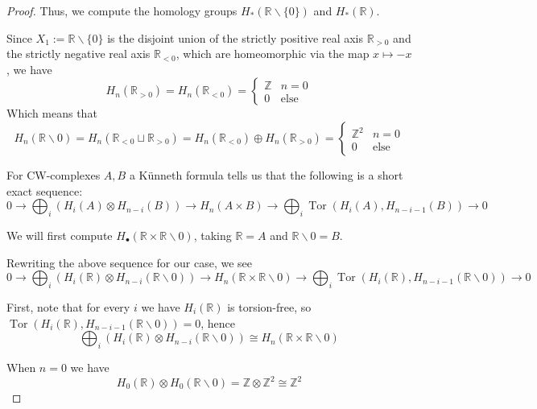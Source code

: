 \documentclass{article}
\DeclareMathOperator{\Tor}{Tor}
\begin{document}
\begin{enumerate}
\begin{proof}
		Thus, we compute the homology groups $H_*(\mathbb{R} \backslash \{0\})$ and $H_*(\mathbb{R})$.
		
		Since $X_1 := \mathbb{R} \backslash \{0\}$ is the disjoint union of the strictly positive real axis $\mathbb{R}_{> 0}$ and the strictly negative real axis $\mathbb{R}_{< 0}$, which are homeomorphic via the map $x \mapsto -x$,
		we have 
		\[H_n(\mathbb{R}_{> 0}) = H_n(\mathbb{R}_{< 0}) = \begin{cases} \mathbb{Z} &n=0 \\ 0 &\text{else}  \end{cases} \]
		Which means that
		\[H_n(\mathbb{R} \backslash 0) = H_n(\mathbb{R}_{< 0}\sqcup \mathbb{R}_{> 0} ) = H_n(\mathbb{R}_{< 0}) \oplus H_n(\mathbb{R}_{> 0} )  = \begin{cases} \mathbb{Z}^2 & n=0 \\ 0 & \text{else} \end{cases}\]
		
		
		For CW-complexes $A,B$ a K\"unneth formula tells us that the following is a short exact sequence:
		\begin{equation} 0 \rightarrow \bigoplus_i \left ( H_i(A) \otimes H_{n-i}(B) \right ) \rightarrow H_n(A\times B) \rightarrow
		\bigoplus_i \Tor \left ( H_i(A), H_{n-i-1}(B) \right ) \rightarrow 0 \label{seq:Kunneth}\end{equation}
		
		We will first compute $H_\bullet (\mathbb{R} \times \mathbb{R}\backslash 0)$, taking $\mathbb{R} = A$ and $\mathbb{R}\backslash 0 = B$.
		
		Rewriting the above sequence for our case, we see 
		\[ 0 \rightarrow \bigoplus_i \left ( H_i(\mathbb{R}) \otimes H_{n-i}(\mathbb{R}\backslash 0) \right ) \rightarrow H_n(\mathbb{R}\times \mathbb{R}\backslash 0) \rightarrow
		\bigoplus_i \Tor \left ( H_i(\mathbb{R}), H_{n-i-1}(\mathbb{R}\backslash 0) \right ) \rightarrow 0\]
		
		First, note that for every $i$ we have $H_i(\mathbb{R})$ is torsion-free, so $\Tor \left ( H_i(\mathbb{R}), H_{n-i-1}(\mathbb{R}\backslash 0) \right ) = 0$, hence
		\[ \bigoplus_i \left ( H_i(\mathbb{R}) \otimes H_{n-i}(\mathbb{R}\backslash 0) \right ) \cong H_n(\mathbb{R}\times \mathbb{R}\backslash 0) \]
		
		When $n =0$ we have 
		\[H_0 (\mathbb{R}) \otimes H_0 (\mathbb{R} \backslash 0) = \mathbb{Z} \otimes \mathbb{Z}^2 \cong \mathbb{Z}^2\]
		

\end{proof}
\end{enumerate}
\end{document}
